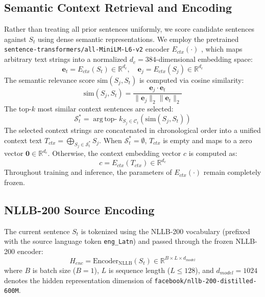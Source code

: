 \documentclass[conference]{IEEEtran}
\begin{document}
\subsection{Semantic Context Retrieval and Encoding}
Rather than treating all prior sentences uniformly, we score candidate sentences against $S_t$ using dense semantic representations. We employ the pretrained \texttt{sentence-transformers/all-MiniLM-L6-v2} encoder $E_{ctx}(\cdot)$ \cite{wang2020minilm}, which maps arbitrary text strings into a normalized $d_c = 384$-dimensional embedding space:
\begin{equation}
\mathbf{e}_t = E_{ctx}(S_t) \in \mathbb{R}^{d_c}, \quad \mathbf{e}_j = E_{ctx}(S_j) \in \mathbb{R}^{d_c}
\end{equation}
The semantic relevance score $\text{sim}(S_j, S_t)$ is computed via cosine similarity:
\begin{equation}
\text{sim}(S_j, S_t) = \frac{\mathbf{e}_j \cdot \mathbf{e}_t}{\|\mathbf{e}_j\|_2 \|\mathbf{e}_t\|_2}
\end{equation}
The top-$k$ most similar context sentences are selected:
\begin{equation}
\mathcal{S}^*_t = \operatorname{arg\,top-}k_{S_j \in \mathcal{C}_t} \left(\text{sim}(S_j, S_t)\right)
\end{equation}
The selected context strings are concatenated in chronological order into a unified context text $T_{ctx} = \bigoplus_{S_j \in \mathcal{S}^*_t} S_j$. When $\mathcal{S}^*_t = \emptyset$, $T_{ctx}$ is empty and maps to a zero vector $\mathbf{0} \in \mathbb{R}^{d_c}$. Otherwise, the context embedding vector $c$ is computed as:
\begin{equation}
c = E_{ctx}(T_{ctx}) \in \mathbb{R}^{d_c}
\end{equation}
Throughout training and inference, the parameters of $E_{ctx}(\cdot)$ remain completely frozen.

\subsection{NLLB-200 Source Encoding}
The current sentence $S_t$ is tokenized using the NLLB-200 vocabulary (prefixed with the source language token \texttt{eng\_Latn}) and passed through the frozen NLLB-200 encoder:
\begin{equation}
H_{enc} = \text{Encoder}_{\text{NLLB}}(S_t) \in \mathbb{R}^{B \times L \times d_{model}}
\end{equation}
where $B$ is batch size ($B=1$), $L$ is sequence length ($L \le 128$), and $d_{model} = 1024$ denotes the hidden representation dimension of \texttt{facebook/nllb-200-distilled-600M}.
\end{document}

